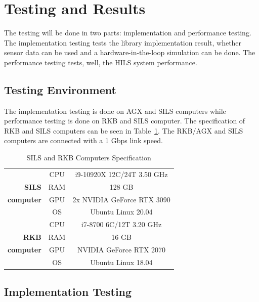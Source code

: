 \section{Testing and Results}

The testing will be done in two parts: implementation and performance testing.
The implementation testing tests the library implementation result, whether
sensor data can be used and a hardware-in-the-loop simulation can be done. The
performance testing tests, well, the HILS system performance.

\subsection{Testing Environment}

The implementation testing is done on AGX and SILS computers while performance
testing is done on RKB and SILS computer. The specification of RKB and SILS
computers can be seen in Table~\ref{tbl-section-5-computers-specs}. The RKB/AGX
and SILS computers are connected with a 1 Gbps link speed.

\begin{table}[htbp]
	\caption{SILS and RKB Computers Specification}
	\label{tbl-section-5-computers-specs}
	\begin{center}
		\begin{tabular}{r c c}
			\toprule
			                  & CPU & i9-10920X 12C/24T 3.50 GHz \\
			\textbf{SILS}     & RAM & 128 GB                     \\
			\textbf{computer} & GPU & 2x NVIDIA GeForce RTX 3090 \\
			                  & OS  & Ubuntu Linux 20.04         \\
			\midrule
			                  & CPU & i7-8700 6C/12T 3.20 GHz    \\
			\textbf{RKB}      & RAM & 16 GB                      \\
			\textbf{computer} & GPU & NVIDIA GeForce RTX 2070    \\
			                  & OS  & Ubuntu Linux 18.04         \\
			\bottomrule
		\end{tabular}
	\end{center}
\end{table}

\subsection{Implementation Testing}\label{section-4-implementation-testing}

